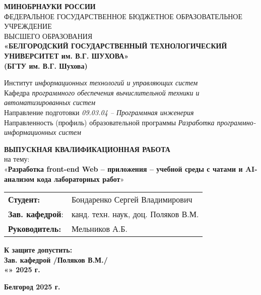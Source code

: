 \begin{titlepage}
    \centering
    {\small \textbf{МИНОБРНАУКИ РОССИИ}}\\
    {\small ФЕДЕРАЛЬНОЕ ГОСУДАРСТВЕННОЕ БЮДЖЕТНОЕ ОБРАЗОВАТЕЛЬНОЕ УЧРЕЖДЕНИЕ}\\
    {\small ВЫСШЕГО ОБРАЗОВАНИЯ}\\
    \textbf{
    «БЕЛГОРОДСКИЙ ГОСУДАРСТВЕННЫЙ ТЕХНОЛОГИЧЕСКИЙ \\
    УНИВЕРСИТЕТ им. В.Г. ШУХОВА» \\
    (БГТУ им. В.Г. Шухова) \\
    }
    
    \vfill %
    
    \raggedright
    Институт \textit{информационных технологий и управляющих систем}\\
    Кафедра \textit{программного обеспечения вычислительной техники и автоматизированных систем}\\
    Направление подготовки \textit{09.03.04 – Программная инженерия}\\
    Направленность (профиль) образовательной программы \textit{Разработка программно-информационных систем}
    
    \centering
    \vfill
    
    \textbf{ВЫПУСКНАЯ КВАЛИФИКАЦИОННАЯ РАБОТА}\\
    {\large на тему:\\[1ex]
    «\textbf{Разработка front-end Web – приложения – учебной среды с чатами и AI-анализом кода лабораторных работ}»}
    
    \vfill %
    
    \raggedright
    \begin{tabular}{@{} l l @{}}
        \textbf{Студент:}       & Бондаренко Сергей Владимирович \\
        \textbf{Зав. кафедрой}: & канд. техн. наук, доц. Поляков В.М. \\
        \textbf{Руководитель:}  & Мельников А.Б.
    \end{tabular}
    
    \vfill
    
    \centering
    \begin{minipage}{0.7\textwidth}
        \textbf{К защите допустить:\\
        Зав. кафедрой \underline{\hspace{4cm}} /Поляков В.М./\\
        «\underline{\hspace{1cm}}» \underline{\hspace{2cm}} 2025 г.}
    \end{minipage}
    
    \vfill
    
    \textbf{Белгород 2025 г.}
    
\end{titlepage}

